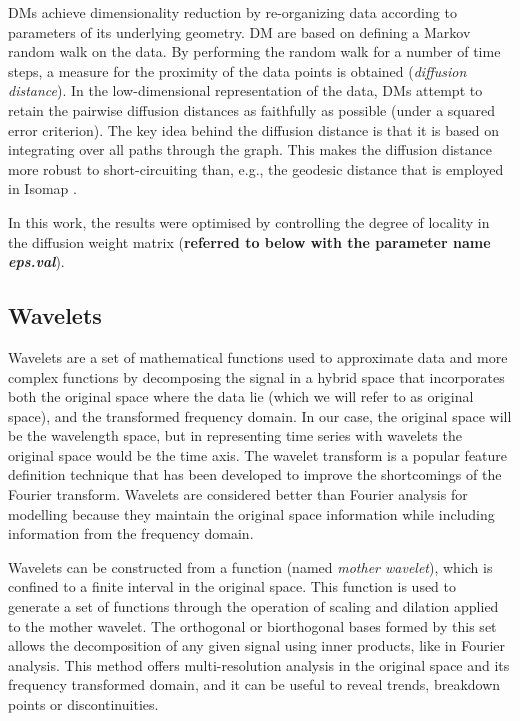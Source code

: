 \documentclass[a4paper,fleqn,usenatbib]{mnras}
\begin{document}
{DMs achieve dimensionality reduction by re-organizing data according
to parameters of its underlying geometry. DM are based on defining a
Markov random walk on the data. By performing the random walk for a
number of time steps, a measure for the proximity of the data points
is obtained (\textit{diffusion distance}). In the low-dimensional
representation of the data, DMs attempt to retain the pairwise
diffusion distances as faithfully as possible (under a squared error
criterion). The key idea behind the diffusion distance is that it is
based on integrating over all paths through the graph. This makes the
diffusion distance more robust to short-circuiting than, e.g., the
geodesic distance that is employed in Isomap \citep{tenenbaum:00}.

In this work, the results were optimised by controlling the degree of
locality in the diffusion weight matrix ({\bf referred to below with 
the parameter name \textit{eps.val}}).

\subsection{Wavelets}

Wavelets \citep{mallat:98} are a set of mathematical functions used to
approximate data and more complex functions by decomposing the signal
in a hybrid space that incorporates both the original space where the
data lie (which we will refer to as original space), and the
transformed frequency domain. In our case, the original space will be
the wavelength space, but in representing time series with wavelets
the original space would be the time axis. The wavelet transform is a
popular feature definition technique that has been developed to
improve the shortcomings of the Fourier transform. Wavelets are
considered better than Fourier analysis for modelling because they
maintain the original space information while including information
from the frequency domain.

Wavelets can be constructed from a function (named \textit{mother
  wavelet}), which is confined to a finite interval in the original
space. This function is used to generate a set of functions through
the operation of scaling and dilation applied to the mother
wavelet. The orthogonal or biorthogonal bases formed by this set
allows the decomposition of any given signal using inner products,
like in Fourier analysis. This method offers multi-resolution analysis
in the original space and its frequency transformed domain, and it can
be useful to reveal trends, breakdown points or discontinuities.

}
\end{document}
